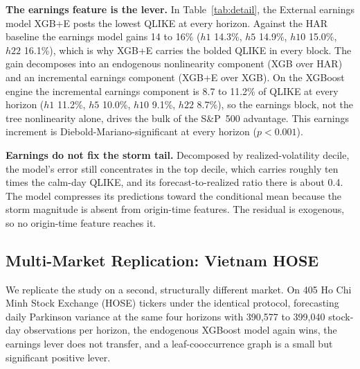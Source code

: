 \documentclass[runningheads]{llncs}
\begin{document}
\textbf{The earnings feature is the lever.} In Table~\ref{tab:detail}, the External earnings model
XGB+E posts the lowest QLIKE at every horizon. Against the HAR baseline the earnings model gains 14 to
16\% ($h1$ 14.3\%, $h5$ 14.9\%, $h10$ 15.0\%, $h22$ 16.1\%), which is why XGB+E carries the bolded
QLIKE in every block. %
The gain decomposes into an endogenous nonlinearity component (XGB over HAR) and an incremental earnings
component (XGB+E over XGB). On the XGBoost engine the incremental earnings component is 8.7 to 11.2\% of
QLIKE at every horizon ($h1$ 11.2\%, $h5$ 10.0\%, $h10$ 9.1\%, $h22$ 8.7\%), so the earnings block, not
the tree nonlinearity alone, drives the bulk of the S\&P~500 advantage. This earnings increment is
Diebold-Mariano-significant at every horizon ($p<0.001$).

\textbf{Earnings do not fix the storm tail.} Decomposed by realized-volatility decile, the model's
error still concentrates in the top decile, which carries roughly ten times the calm-day QLIKE, and
its forecast-to-realized ratio there is about 0.4. The model compresses its predictions toward the
conditional mean because the storm magnitude is absent from origin-time features. The residual is
exogenous, so no origin-time feature reaches it.

\FloatBarrier
\subsection{Multi-Market Replication: Vietnam HOSE}\label{sec:hose}
We replicate the study on a second, structurally different market. On 405 Ho Chi Minh Stock Exchange
(HOSE) tickers under the identical protocol, forecasting daily Parkinson variance at the same four
horizons with 390{,}577 to 399{,}040 stock-day observations per horizon, the endogenous XGBoost model
again wins, the earnings lever does not transfer, and a leaf-cooccurrence graph is a small but
significant positive lever.
\end{document}

